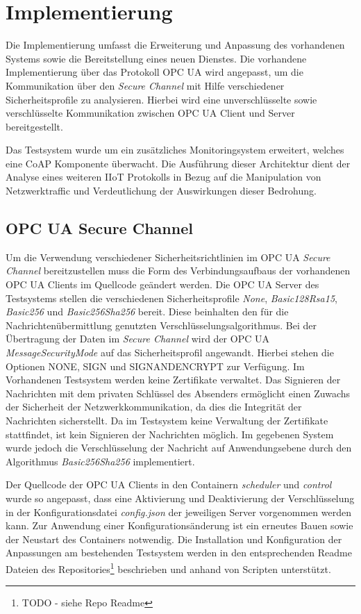 \section{Implementierung}
Die Implementierung umfasst die Erweiterung und Anpassung des vorhandenen Systems sowie die Bereitstellung eines neuen Dienstes. Die vorhandene Implementierung über das Protokoll \ac{OPC UA} wird angepasst, um die Kommunikation über den \textit{Secure Channel} mit Hilfe verschiedener Sicherheitsprofile zu analysieren. Hierbei wird eine unverschlüsselte sowie verschlüsselte Kommunikation zwischen \ac{OPC UA} Client und Server bereitgestellt.

Das Testsystem wurde um ein zusätzliches Monitoringsystem erweitert, welches eine \ac{CoAP} Komponente überwacht. Die Ausführung dieser Architektur dient der Analyse eines weiteren \ac{IIoT} Protokolls in Bezug auf die Manipulation von Netzwerktraffic und Verdeutlichung der Auswirkungen dieser Bedrohung.

\subsection{\ac{OPC UA} Secure Channel}
\label{Umsetzung:OPC UA Secure Channel}
Um die Verwendung verschiedener Sicherheitsrichtlinien im \ac{OPC UA} \textit{Secure Channel} bereitzustellen muss die Form des Verbindungsaufbaus der vorhandenen \ac{OPC UA} Clients im Quellcode geändert werden. Die \ac{OPC UA} Server des Testsystems stellen die verschiedenen Sicherheitsprofile \textit{None}, \textit{Basic128Rsa15}, \textit{Basic256} und \textit{Basic256Sha256} bereit. Diese beinhalten den für die Nachrichtenübermittlung genutzten Verschlüsselungsalgorithmus. Bei der Übertragung der Daten im \textit{Secure Channel} wird der \ac{OPC UA} \textit{MessageSecurityMode} auf das Sicherheitsprofil angewandt. Hierbei stehen die Optionen NONE, SIGN und SIGNANDENCRYPT zur Verfügung. Im Vorhandenen Testsystem werden keine Zertifikate verwaltet. Das Signieren der Nachrichten mit dem privaten Schlüssel des Absenders ermöglicht einen Zuwachs der Sicherheit der Netzwerkkommunikation, da dies die Integrität der Nachrichten sicherstellt. Da im Testsystem keine Verwaltung der Zertifikate stattfindet, ist kein Signieren der Nachrichten möglich. Im gegebenen System wurde jedoch die Verschlüsselung der Nachricht auf Anwendungsebene durch den Algorithmus \textit{Basic256Sha256} implementiert.

Der Quellcode der \ac{OPC UA} Clients in den Containern \textit{scheduler} und \textit{control} wurde so angepasst, dass eine Aktivierung und Deaktivierung der Verschlüsselung in der Konfigurationsdatei \textit{config.json} der jeweiligen Server vorgenommen werden kann. Zur Anwendung einer Konfigurationsänderung ist ein erneutes Bauen sowie der Neustart des Containers notwendig. Die Installation und Konfiguration der Anpassungen am bestehenden Testsystem werden in den entsprechenden Readme Dateien des Repositories\footnote{TODO - siehe Repo Readme} beschrieben und anhand von Scripten unterstützt.

